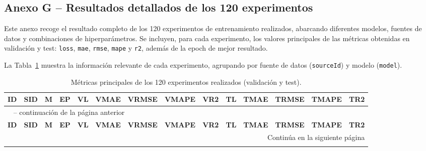 \begin{landscape}
\section*{Anexo G – Resultados detallados de los 120 experimentos}
\label{anexo:resultados_exp}

Este anexo recoge el resultado completo de los 120 experimentos de entrenamiento realizados, abarcando diferentes modelos, fuentes de datos y combinaciones de hiperparámetros. Se incluyen, para cada experimento, los valores principales de las métricas obtenidas en validación y test: \texttt{loss}, \texttt{mae}, \texttt{rmse}, \texttt{mape} y \texttt{r2}, además de la epoch de mejor resultado. 

La Tabla~\ref{tab:metricas_120_experimentos} muestra la información relevante de cada experimento, agrupando por fuente de datos (\texttt{sourceId}) y modelo (\texttt{model}).

\scriptsize
\setlength{\extrarowheight}{0.5pt}

\begin{longtable}{c c c c c c c c c c c c c c}
	\caption{Métricas principales de los 120 experimentos realizados (validación y test).}
	\label{tab:metricas_120_experimentos} \\
	\toprule
	\textbf{ID} & \textbf{SID} & \textbf{M} & \textbf{EP} & \textbf{VL} & \textbf{VMAE} & \textbf{VRMSE} & \textbf{VMAPE} & \textbf{VR2} & \textbf{TL} & \textbf{TMAE} & \textbf{TRMSE} & \textbf{TMAPE} & \textbf{TR2} \\
	\midrule
	\endfirsthead
	
	\multicolumn{14}{l}{\tablename\ \thetable{} -- continuación de la página anterior} \\
	\toprule
	\textbf{ID} & \textbf{SID} & \textbf{M} & \textbf{EP} & \textbf{VL} & \textbf{VMAE} & \textbf{VRMSE} & \textbf{VMAPE} & \textbf{VR2} & \textbf{TL} & \textbf{TMAE} & \textbf{TRMSE} & \textbf{TMAPE} & \textbf{TR2} \\
	\midrule
	\endhead
	
	\bottomrule
	\multicolumn{14}{r}{Continúa en la siguiente página} \\
	\endfoot
	

\end{longtable}
\end{landscape}
